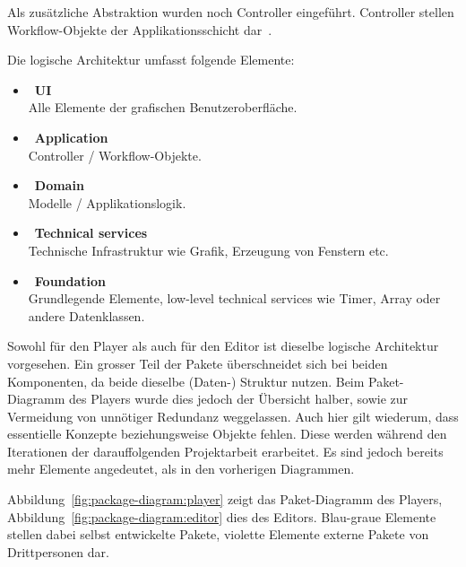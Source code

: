 Als zusätzliche Abstraktion wurden noch Controller eingeführt. Controller
stellen Workflow-Objekte der Applikationsschicht dar~\cite[S.
209]{larman_applying_2004}.

Die logische Architektur umfasst folgende Elemente:
\begin{itemize}
    \item~\textbf{UI}\\
        Alle Elemente der grafischen Benutzeroberfläche.

    \item~\textbf{Application}\\
        Controller / Workflow-Objekte.

    \item~\textbf{Domain}\\
        Modelle / Applikationslogik.

    \item~\textbf{Technical services}\\
        Technische Infrastruktur wie Grafik, Erzeugung von Fenstern etc.

    \item~\textbf{Foundation}\\
        Grundlegende Elemente, low-level technical services wie Timer, Array
        oder andere Datenklassen.
\end{itemize}

Sowohl für den Player als auch für den Editor ist dieselbe logische Architektur
vorgesehen. Ein grosser Teil der Pakete überschneidet sich bei beiden
Komponenten, da beide dieselbe (Daten-) Struktur nutzen. Beim Paket-Diagramm
des Players wurde dies jedoch der Übersicht halber, sowie zur Vermeidung von
unnötiger Redundanz weggelassen. Auch hier gilt wiederum, dass essentielle
Konzepte beziehungsweise Objekte fehlen. Diese werden während den Iterationen
der darauffolgenden Projektarbeit erarbeitet. Es sind jedoch bereits mehr
Elemente angedeutet, als in den vorherigen Diagrammen.

Abbildung~\ref{fig:package-diagram:player} zeigt das Paket-Diagramm des
Players, Abbildung~\ref{fig:package-diagram:editor} dies des Editors.
Blau-graue Elemente stellen dabei selbst entwickelte Pakete, violette Elemente
externe Pakete von Drittpersonen dar. 

